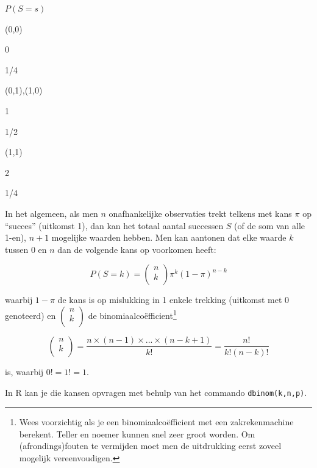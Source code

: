 \documentclass[
  12pt,dutch,coursenotes]{book}
\newcommand{\passthrough}[1]{#1}
\begin{document}
\(P(S=s)\)

(0,0)

0

1/4

(0,1),(1,0)

1

1/2

(1,1)

2

1/4

In het algemeen, als men \(n\) onafhankelijke observaties trekt telkens met kans \(\pi\) op ``succes'' (uitkomst 1), dan kan het totaal aantal successen
\(S\) (of de som van alle 1-en), \(n+1\) mogelijke waarden hebben. Men kan
aantonen dat elke waarde \(k\) tussen 0 en \(n\) dan de volgende kans op
voorkomen heeft:

\begin{equation}
P(S=k) = \left (
\begin{array}{c}
n \\
k \\
\end{array}
\right ) \pi^k (1-\pi)^{n-k}  \label{eq:binomk}
\end{equation}

waarbij \(1-\pi\) de kans is op mislukking in 1 enkele trekking (uitkomst met 0 genoteerd) en
\(\left(\begin{array}{c} n \\ k \\ \end{array}\right)\) de binomiaalcoëfficient\footnote{Wees voorzichtig als je een binomiaalcoëfficient met een zakrekenmachine
  berekent. Teller en noemer kunnen snel zeer groot worden. Om (afrondings)fouten te vermijden moet men de uitdrukking eerst zoveel
  mogelijk vereenvoudigen.}

\begin{equation*}
\left (
\begin{array}{c}
n \\
k \\
\end{array}
\right ) = \frac{n \times (n-1) \times ...\times (n-k+1) }{ k!} = \frac{ n!}{ k!(n-k)! }
\end{equation*}

is, waarbij \(0!=1!=1\).

In R kan je die kansen opvragen met behulp van het commando \passthrough{\lstinline!dbinom(k,n,p)!}.
\end{document}
